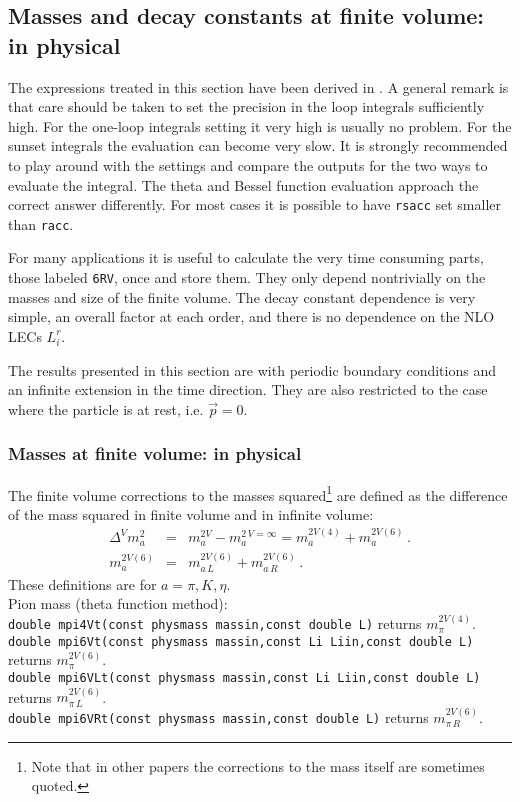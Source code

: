 \documentclass[12pt,a4paper]{article}
\newcommand{\mytt}[1]{\texttt{#1}}
\newcommand{\newfunction}[1]{\mytt{#1}\index{\mytt{#1}}}
\begin{document}
\subsection{Masses and decay constants at finite volume: in physical}
\label{massdecayvevV}

The expressions treated in this section have been
derived in \cite{Bijnens:2014dea}. A general remark is that care should be
taken to set the precision in the loop integrals sufficiently high.
For the one-loop integrals setting it very high is usually no problem.
For the sunset integrals the evaluation can become very slow. It is
strongly recommended to play around with the settings and compare the outputs
for the two ways to evaluate the integral. 
The theta and Bessel function evaluation approach the correct answer
differently.
For most cases
it is possible to have \mytt{rsacc} set smaller than \mytt{racc}.

For many applications it is useful to calculate the
very time consuming parts, those labeled \mytt{6RV}, once and store them.
They only depend nontrivially on the masses and size of the finite volume.
The decay constant dependence is very simple, an overall factor at each order,
and there is no dependence
on the NLO LECs $L_i^r$.

The results presented in this section are with periodic boundary conditions
and an infinite extension in the time direction. They are also restricted
to the case where the particle is at rest, i.e. $\vec p=0$.

\subsubsection{Masses at finite volume: in physical}

The finite volume corrections to the masses squared\footnote{Note that
in other papers the corrections to the mass itself are sometimes
quoted.} are defined as the difference of the mass squared in finite volume
and in infinite volume:
\begin{eqnarray}
\Delta^V m^2_a &=& m^{2V}_a-m^{2\,V=\infty}_a
= m_a^{2V(4)}+ m_a^{2V(6)}\,.
\nonumber\\
m_a^{2V(6)} &=& m_{a\,L}^{2V(6)}+m_{a\,R}^{2V(6)}\,.
\end{eqnarray}
These definitions are for $a=\pi,K,\eta$.\\

Pion mass (theta function method):\\
\mytt{double \newfunction{mpi4Vt}(const physmass massin,const double L)}
returns $m_\pi^{2V(4)}$.\\
\mytt{double \newfunction{mpi6Vt}(const physmass massin,const Li Liin,const double L)}
returns $m_\pi^{2V(6)}$.\\
\mytt{double \newfunction{mpi6VLt}(const physmass massin,const Li Liin,const double L)}
returns $m_{\pi\,L}^{2V(6)}$.\\
\mytt{double \newfunction{mpi6VRt}(const physmass massin,const double L)}
returns $m_{\pi\,R}^{2V(6)}$.\\
\end{document}
